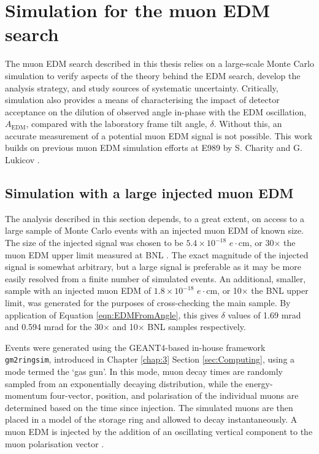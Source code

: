 
\chapter[Simulation for the muon EDM search]{Simulation for the muon EDM \\search}\label{chap:5}

The muon EDM search described in this thesis relies on a large-scale Monte Carlo simulation to verify aspects of the theory behind the EDM search, develop the analysis strategy, and study sources of systematic uncertainty. Critically, simulation also provides a means of characterising the impact of detector acceptance on the dilution of observed angle in-phase with the EDM oscillation, $A_{\text{EDM}}$, compared with the laboratory frame tilt angle, $\delta$. Without this, an accurate measurement of a potential muon EDM signal is not possible. This work builds on previous muon EDM simulation efforts at E989 by S. Charity \cite{Charity} and G. Lukicov \cite{Lukicov}.

\section{Simulation with a large injected muon EDM}\label{sec:SimulatingALargeEDM}

The analysis described in this section depends, to a great extent, on access to a large sample of Monte Carlo events with an injected muon EDM of known size. The size of the injected signal was chosen to be $5.4\times10^{-18}$ $e\cdot\text{cm}$, or 30$\times$ the muon EDM upper limit measured at BNL \cite{BNLEDM}. The exact magnitude of the injected signal is somewhat arbitrary, but a large signal is preferable as it may be more easily resolved from a finite number of simulated events. An additional, smaller, sample with an injected muon EDM of $1.8\times10^{-18}$ $e\cdot\text{cm}$, or 10$\times$ the BNL upper limit, was generated for the purposes of cross-checking the main sample. By application of Equation \ref{eqn:EDMFromAngle}, this gives $\delta$ values of 1.69 mrad and 0.594 mrad for the 30$\times$ and 10$\times$ BNL samples respectively. 

Events were generated using the GEANT4-based in-house framework \texttt{gm2ringsim}, introduced in Chapter \ref{chap:3} Section \ref{sec:Computing}, using a mode termed the `gas gun'. In this mode, muon decay times are randomly sampled from an exponentially decaying distribution, while the energy-momentum four-vector, position, and polarisation of the individual muons are determined based on the time since injection. The simulated muons are then placed in a model of the storage ring and allowed to decay instantaneously. A muon EDM is injected by the addition of an oscillating vertical component to the muon polarisation vector \cite{Charity}. 

